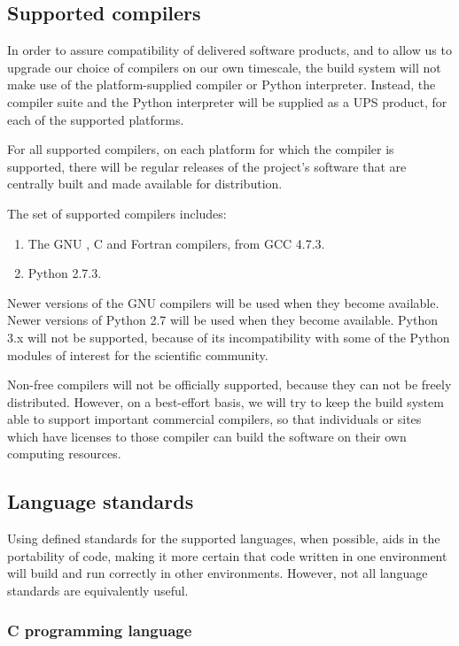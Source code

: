 \documentclass[draftmode,draftwater]{memarticle}
\begin{document}
\subsection{Supported compilers}

In order to assure compatibility of delivered software products, and to
allow us to upgrade our choice of compilers on our own timescale, the
build system will not make use of the platform-supplied compiler or
Python interpreter. Instead, the compiler suite and the Python
interpreter will be supplied as a UPS product, for each of the supported
platforms.

For all supported compilers, on each platform for which the compiler is
supported, there will be regular releases of the project's software that
are centrally built and made available for distribution.

The set of supported compilers includes:
\begin{enumerate}
\item The GNU \cpp{}, C and Fortran compilers, from GCC 4.7.3.
\item Python 2.7.3.
\end{enumerate}
Newer versions of the GNU compilers will be used when they become
available. Newer versions of Python 2.7 will be used when they become
available. Python 3.x will not be supported, because of its
incompatibility with some of the Python modules of interest for the
scientific community.

Non-free compilers will not be officially supported, because they can
not be freely distributed. However, on a best-effort basis, we will try
to keep the build system able to support important commercial compilers,
so that individuals or sites which have licenses to those compiler can
build the software on their own computing resources.

\subsection{Language standards}

Using defined standards for the supported languages, when possible, aids
in the portability of code, making it more certain that code written in
one environment will build and run correctly in other environments.
However, not all language standards are equivalently useful.

\subsubsection{C programming language}
\end{document}
